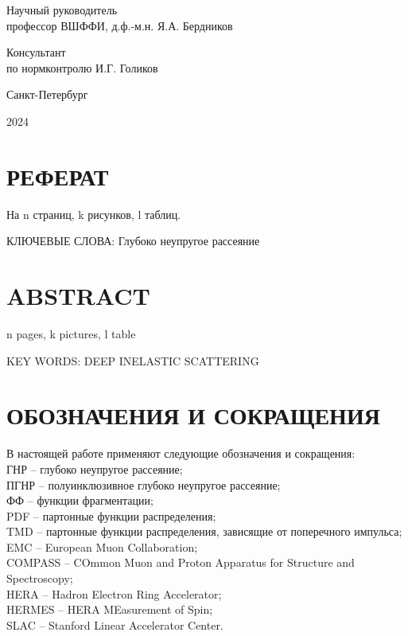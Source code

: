 \begin{titlepage}
\begin{spacing}{1}
\begin{flushleft}
	
	Научный руководитель\\
	профессор ВШФФИ, д.ф.-м.н.
	\hspace{0.1 cm} \hspace{1.8 cm} 
	\hfill  {Я.А. Бердников}
	\vspace{0.5cm}
	
	Консультант \\
	по нормконтролю \hspace{2.1 cm} \hspace{2 cm} \hfill  {И.Г. Голиков}
\end{flushleft}


\begin{center}
	Санкт-Петербург
\end{center}
\begin{center}
    2024
\end{center}
\newpage
\pagestyle{empty}
\section*{РЕФЕРАТ}
\begin{center}
    На n страниц, k рисунков, l таблиц.
\end{center}
КЛЮЧЕВЫЕ СЛОВА: Глубоко неупругое рассеяние
\\


\section*{ABSTRACT}
\begin{center}
    n pages, k pictures, l table
\end{center} 
KEY WORDS: DEEP INELASTIC SCATTERING
\\
\end{spacing}
\newpage
\section*{ОБОЗНАЧЕНИЯ И СОКРАЩЕНИЯ}

В настоящей работе применяют следующие обозначения и сокращения: \\
ГНР -- глубоко неупругое рассеяние; \\
ПГНР -- полуинклюзивное глубоко неупругое рассеяние; \\
ФФ -- функции фрагментации; \\
PDF -- партонные функции распределения; \\ 
TMD -- партонные функции распределения, зависящие от поперечного импульса; \\
EMC -- European Muon Collaboration; \\
COMPASS -- COmmon Muon and Proton Apparatus for Structure and
Spectroscopy; \\
HERA -- Hadron Electron Ring Accelerator; \\
HERMES -- HERA MEasurement of Spin; \\
SLAC -- Stanford Linear Accelerator Center.


\end{titlepage}	
